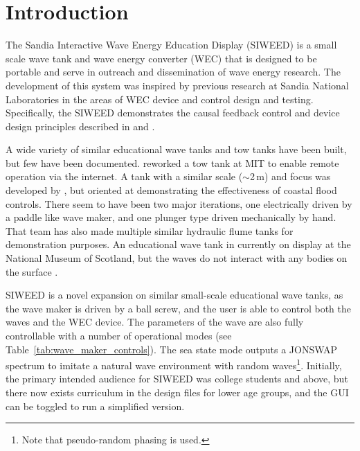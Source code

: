 \documentclass[hardware,article,submit,pdftex,moreauthors]{Definitions/mdpi}
\begin{document}
\section{Introduction}
The Sandia Interactive Wave Energy Education Display (SIWEED) is a small scale wave tank and wave energy converter (WEC) that is designed to be portable and serve in outreach and dissemination of wave energy research.
The development of this system was inspired by previous research at Sandia National Laboratories in the areas of WEC device and control design and testing.
Specifically, the SIWEED demonstrates the causal feedback control and device design principles described in \citet{Bacelli2020} and \citet{Coe2020a}.


A wide variety of similar educational wave tanks and tow tanks have been built, but few have been documented.
\citet{unger2006creating} reworked a tow tank at MIT to enable remote operation via the internet.
A tank with a similar scale ($\sim$2\,m) and focus was developed by \cite{Trust2015}, but oriented at demonstrating the effectiveness of coastal flood controls.
There seem to have been two major iterations, one electrically driven by a paddle like wave maker, and one plunger type driven mechanically by hand. 
That team has also made multiple similar hydraulic flume tanks for demonstration purposes.
An educational wave tank in currently on display at the National Museum of Scotland, but the waves do not interact with any bodies on the surface \cite{Ivan2016}. 

SIWEED is a novel expansion on similar small-scale educational wave tanks, as the wave maker is driven by a ball screw, and the user is able to control both the waves and the WEC device.
The parameters of the wave are also fully controllable with a number of operational modes (see Table~\ref{tab:wave_maker_controls}).
The sea state mode outputs a JONSWAP spectrum \cite{Hasselmann1973} to imitate a natural wave environment with random waves\footnote{Note that pseudo-random phasing is used.}.
Initially, the primary intended audience for SIWEED was college students and above, but there now exists curriculum in the design files for lower age groups, and the GUI can be toggled to run a simplified version.
\end{document}
